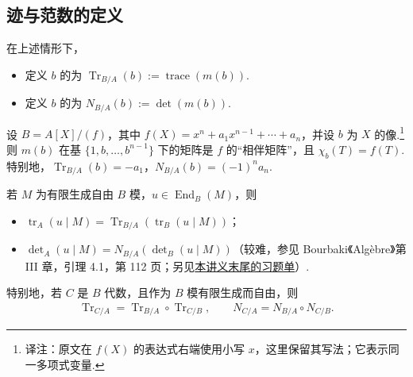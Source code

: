 \subsection{迹与范数的定义}\label{sec:nt-2-3-1}
\begin{definition*}
在上述情形下，
\begin{itemize}
\item 定义 $b$ 的为 $\operatorname{Tr}_{B/A}(b):=\operatorname{trace}(m(b))$.
\item 定义 $b$ 的为 $N_{B/A}(b):=\det(m(b))$.
\end{itemize}
\end{definition*}
\begin{example*}
设 $B=A[X]/(f)$，其中 $f(X)=x^n+a_1x^{n-1}+\cdots+a_n$，并设 $b$ 为 $X$ 的像.\footnote{译注：原文在 $f(X)$ 的表达式右端使用小写 $x$，这里保留其写法；它表示同一多项式变量.}则 $m(b)$ 在基 $\{1,b,\ldots,b^{n-1}\}$ 下的矩阵是 $f$ 的``相伴矩阵''，且 $\chi_b(T)=f(T)$.特别地，$\operatorname{Tr}_{B/A}(b)=-a_1$，$N_{B/A}(b)=(-1)^na_n$.
\end{example*}
\begin{exercise*}
若 $M$ 为有限生成自由 $B$ 模，$u\in\operatorname{End}_B(M)$，则
\begin{itemize}
\item $\operatorname{tr}_A(u\mid M)=\operatorname{Tr}_{B/A}(\operatorname{tr}_B(u\mid M))$；
\item $\det_A(u\mid M)=N_{B/A}(\det_B(u\mid M))$（较难，参见 Bourbaki《Algèbre》第 III 章，引理 4.1，第 112 页；另见\hyperref[chap:nt-exercises]{本讲义末尾的习题单}）.
\end{itemize}
特别地，若 $C$ 是 $B$ 代数，且作为 $B$ 模有限生成而自由，则
\begin{align*}
\operatorname{Tr}_{C/A}=\operatorname{Tr}_{B/A}\circ\operatorname{Tr}_{C/B},\qquad N_{C/A}=N_{B/A}\circ N_{C/B}.
\end{align*}
\end{exercise*}

